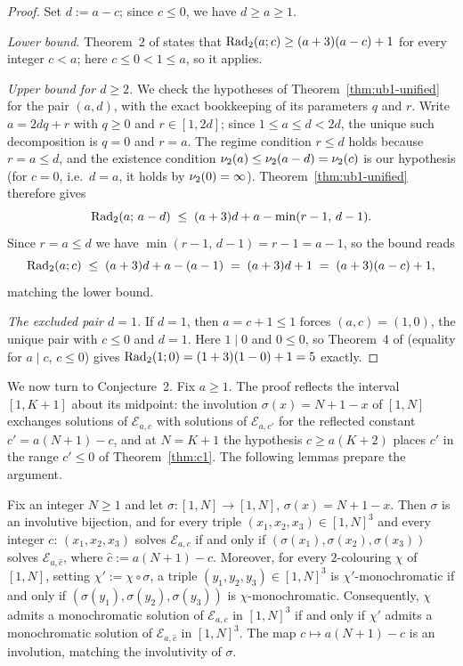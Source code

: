 \begin{proof}
Set $d := a - c$; since $c \le 0$, we have $d \ge a \ge 1$.

\emph{Lower bound.} Theorem~2 of \cite{DT2020} states that
$\mathrm{Rad}_2(a;c) \ge (a+3)(a-c) + 1$ for every integer $c < a$; here
$c \le 0 < 1 \le a$, so it applies.

\emph{Upper bound for $d \ge 2$.} We check the hypotheses of
Theorem~\ref{thm:ub1-unified} for the pair $(a, d)$, with the exact
bookkeeping of its parameters $q$ and $r$. Write $a = 2dq + r$ with
$q \ge 0$ and $r \in [1, 2d]$; since $1 \le a \le d < 2d$, the unique such
decomposition is $q = 0$ and $r = a$. The regime condition $r \le d$ holds
because $r = a \le d$, and the existence condition
$\nu_2(a) \le \nu_2(a - d) = \nu_2(c)$ is our hypothesis (for $c = 0$,
i.e.\ $d = a$, it holds by $\nu_2(0) = \infty$).
Theorem~\ref{thm:ub1-unified} therefore gives
\[
\mathrm{Rad}_2(a;\,a-d) \;\le\; (a+3)d + a - \min(r-1,\, d-1) .
\]
Since $r = a \le d$ we have $\min(r-1,\, d-1) = r - 1 = a - 1$, so the
bound reads
\[
\mathrm{Rad}_2(a;c) \;\le\; (a+3)d + a - (a-1) \;=\; (a+3)d + 1 \;=\; (a+3)(a-c) + 1 ,
\]
matching the lower bound.

\emph{The excluded pair $d = 1$.} If $d = 1$, then $a = c + 1 \le 1$ forces
$(a,c) = (1,0)$, the unique pair with $c \le 0$ and $d = 1$. Here $1 \mid 0$
and $0 \le 0$, so Theorem~4 of \cite{DT2020} (equality for $a \mid c$,
$c \le 0$) gives $\mathrm{Rad}_2(1;0) = (1+3)(1-0) + 1 = 5$ exactly.
\end{proof}

We now turn to Conjecture~2. Fix $a \ge 1$. The proof reflects the interval
$[1, K+1]$ about its midpoint: the involution $\sigma(x) = N+1-x$ of
$[1,N]$ exchanges solutions of $\mathcal{E}_{a,c}$ with solutions of
$\mathcal{E}_{a,c'}$ for the reflected constant $c' = a(N+1) - c$, and at
$N = K+1$ the hypothesis $c \ge a(K+2)$ places $c'$ in the range
$c' \le 0$ of Theorem~\ref{thm:c1}. The following lemmas prepare the
argument.

\begin{lemma}\label{lem:conj-reflect}
Fix an integer $N \ge 1$ and let $\sigma \colon [1,N] \to [1,N]$,
$\sigma(x) = N + 1 - x$. Then $\sigma$ is an involutive bijection, and for
every triple $(x_1,x_2,x_3) \in [1,N]^3$ and every integer $c$:
$(x_1,x_2,x_3)$ solves $\mathcal{E}_{a,c}$ if and only if
$(\sigma(x_1), \sigma(x_2), \sigma(x_3))$ solves $\mathcal{E}_{a,\hat c}$,
where $\hat c := a(N+1) - c$. Moreover, for every $2$-colouring $\chi$ of
$[1,N]$, setting $\chi' := \chi \circ \sigma$, a triple
$(y_1,y_2,y_3) \in [1,N]^3$ is $\chi'$-monochromatic if and only if
$(\sigma(y_1),\sigma(y_2),\sigma(y_3))$ is $\chi$-monochromatic.
Consequently, $\chi$ admits a monochromatic solution of
$\mathcal{E}_{a,c}$ in $[1,N]^3$ if and only if $\chi'$ admits a
monochromatic solution of $\mathcal{E}_{a,\hat c}$ in $[1,N]^3$. The map
$c \mapsto a(N+1) - c$ is an involution, matching the involutivity of
$\sigma$.
\end{lemma}

